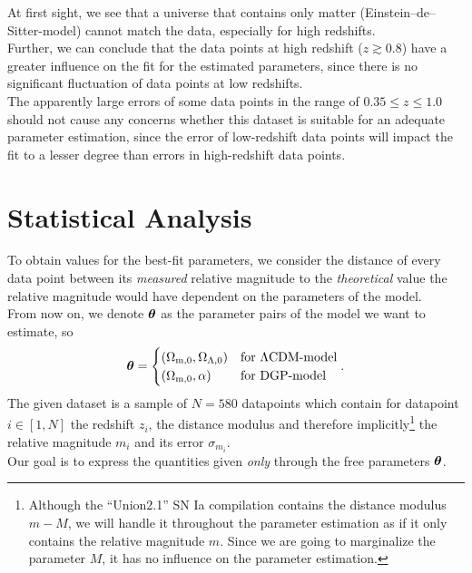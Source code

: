 \noindent At first sight, we see that a universe that contains only matter (Einstein--de--Sitter-model) cannot match the data, especially for high redshifts. \\
Further, we can conclude that the data points at high redshift ($z \gtrsim 0.8$) have a greater influence on the fit for the estimated parameters, since there is no significant fluctuation of data points at low redshifts. \\
The apparently large errors of some data points in the range of $0.35 \leq z \leq 1.0$ should not cause any concerns whether this dataset is suitable for an adequate parameter estimation, since the error of low-redshift data points will impact the fit to a lesser degree than errors in high-redshift data points.

\section{Statistical Analysis}
To obtain values for the best-fit parameters, we consider the distance of every data point between its \textit{measured} relative magnitude to the \textit{theoretical} value the relative magnitude would have dependent on the parameters of the model. \\ 
From now on, we denote $\vb*{\theta}$ as the parameter pairs of the model we want to estimate, so 
\begin{align}
    \vb*{\theta} = \begin{cases}
                        (\Omega_{\text{m},0}, \Omega_{\Lambda,0}) &\text{for $\Lambda$CDM-model}\\
                        (\Omega_{\text{m},0}, \alpha)             &\text{for DGP-model}\\
                   \end{cases}. \label{eq:cosmological-parameters}
\end{align}
The given dataset is a sample of $N = 580$ datapoints which contain for datapoint $i \in [1,N]$ the redshift $z_{i}$, the distance modulus and therefore implicitly\footnote{Although the ``Union2.1'' SN Ia compilation contains the distance modulus $m - M$, we will handle it throughout the parameter estimation as if it only contains the relative magnitude $m$. Since we are going to marginalize the parameter $M$, it has no influence on the parameter estimation.} the relative magnitude $m_{i}$ and its error $\sigma_{m_{i}}$. \\
Our goal is to express the quantities given \textit{only} through the free parameters $\vb*{\theta}$. \\
